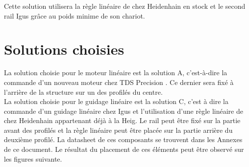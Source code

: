 \begin{table}[H]
  \centering
  \caption{Offres pour le guidage}
  \label{tab:OffreGuid2}
\end{table}

Cette solution utilisera la règle linéaire de chez Heidenhain \cite{Heidenhain} en stock et le second rail Igus \cite{Igus} grâce au poids minime de son chariot.

\section{Solutions choisies}\label{sec:SolChoix}

La solution choisie pour le moteur linéaire est la solution A, c'est-à-dire la commande d'un nouveau moteur chez TDS Precision \cite{TDSPrecisionProducts}. Ce dernier
sera fixé à l'arrière de la structure sur un des profilés du centre.\\

La solution choisie pour le guidage linéaire est la solution C, c'est à dire la commande d'un guidage linéaire chez Igus \cite{Igus} et l'utilisation d'une
règle linéaire de chez Heidenhain \cite{Heidenhain} appartenant déjà à la \acrshort{Heig}. Le rail peut être fixé sur la partie avant des profilés et la règle linéaire peut
être placée sur la partie arrière du deuxième profilé. La datasheet de ces composants se trouvent dans les Annexes de ce document. Le résultat du placement de ces
éléments peut être observé sur les figures suivante.

